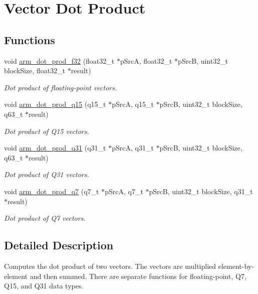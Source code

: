 \hypertarget{group__dot__prod}{\section{Vector Dot Product}
\label{group__dot__prod}
}
\subsection*{Functions}
\begin{DoxyCompactItemize}
\item 
void \hyperlink{group__dot__prod_ga55418d4362f6ba84c327f9b4f089a8c3}{arm\-\_\-dot\-\_\-prod\-\_\-f32} (float32\-\_\-t $\ast$p\-Src\-A, float32\-\_\-t $\ast$p\-Src\-B, uint32\-\_\-t block\-Size, float32\-\_\-t $\ast$result)
\begin{DoxyCompactList}\small\item\em Dot product of floating-\/point vectors. \end{DoxyCompactList}\item 
void \hyperlink{group__dot__prod_ga436d5bed28a4b73b24acbde436a3044b}{arm\-\_\-dot\-\_\-prod\-\_\-q15} (q15\-\_\-t $\ast$p\-Src\-A, q15\-\_\-t $\ast$p\-Src\-B, uint32\-\_\-t block\-Size, q63\-\_\-t $\ast$result)
\begin{DoxyCompactList}\small\item\em Dot product of Q15 vectors. \end{DoxyCompactList}\item 
void \hyperlink{group__dot__prod_gab15d8fa060fc85b4d948d091b7deaa11}{arm\-\_\-dot\-\_\-prod\-\_\-q31} (q31\-\_\-t $\ast$p\-Src\-A, q31\-\_\-t $\ast$p\-Src\-B, uint32\-\_\-t block\-Size, q63\-\_\-t $\ast$result)
\begin{DoxyCompactList}\small\item\em Dot product of Q31 vectors. \end{DoxyCompactList}\item 
void \hyperlink{group__dot__prod_ga9c3293a50ac7ec8ba928bf8e3aaea6c1}{arm\-\_\-dot\-\_\-prod\-\_\-q7} (q7\-\_\-t $\ast$p\-Src\-A, q7\-\_\-t $\ast$p\-Src\-B, uint32\-\_\-t block\-Size, q31\-\_\-t $\ast$result)
\begin{DoxyCompactList}\small\item\em Dot product of Q7 vectors. \end{DoxyCompactList}\end{DoxyCompactItemize}


\subsection{Detailed Description}
Computes the dot product of two vectors. The vectors are multiplied element-\/by-\/element and then summed. There are separate functions for floating-\/point, Q7, Q15, and Q31 data types. 

